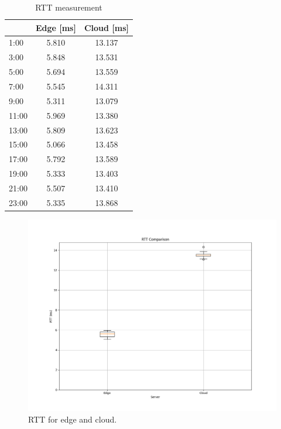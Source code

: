 \documentclass[12pt,a4paper,twoside]{report}
\begin{document}
\begin{table}[!ht]
    \centering
	\caption{RTT measurement}
	\label{T:ping}
    \begin{tabular}{|l|c|c|}
    \hline
        & \textbf{Edge [ms]} & \textbf{Cloud [ms]} \\ \hline
        1:00 & 5.810 & 13.137 \\ \hline
        3:00 & 5.848 & 13.531 \\ \hline
        5:00 & 5.694 & 13.559 \\ \hline
        7:00 & 5.545 & 14.311 \\ \hline
        9:00 & 5.311 & 13.079 \\ \hline
        11:00 & 5.969 & 13.380 \\ \hline
        13:00 & 5.809 & 13.623 \\ \hline
        15:00 & 5.066 & 13.458 \\ \hline
        17:00 & 5.792 & 13.589 \\ \hline
        19:00 & 5.333 & 13.403 \\ \hline
        21:00 & 5.507 & 13.410 \\ \hline
        23:00 & 5.335 & 13.868 \\ \hline
    \end{tabular}
\end{table}

\begin{figure}[ht]
	\centering
	\captionsetup{labelsep=period,name=Graph}
	\includegraphics[width=13cm]{./images/RTT_comp_box.png} 
	\caption{RTT for edge and cloud.}
	\label{G:pings-box}
\end{figure}
\end{document}
